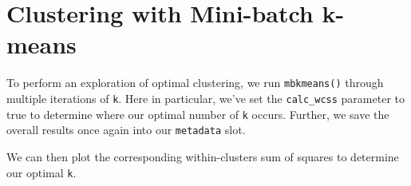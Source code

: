 \documentclass[]{book}
\newenvironment{Shaded}{\begin{snugshade}}{\end{snugshade}}
\newcommand{\ControlFlowTok}[1]{\textcolor[rgb]{0.13,0.29,0.53}{\textbf{#1}}}
\newcommand{\DataTypeTok}[1]{\textcolor[rgb]{0.13,0.29,0.53}{#1}}
\newcommand{\DecValTok}[1]{\textcolor[rgb]{0.00,0.00,0.81}{#1}}
\newcommand{\KeywordTok}[1]{\textcolor[rgb]{0.13,0.29,0.53}{\textbf{#1}}}
\newcommand{\NormalTok}[1]{#1}
\newcommand{\OperatorTok}[1]{\textcolor[rgb]{0.81,0.36,0.00}{\textbf{#1}}}
\newcommand{\OtherTok}[1]{\textcolor[rgb]{0.56,0.35,0.01}{#1}}
\newcommand{\StringTok}[1]{\textcolor[rgb]{0.31,0.60,0.02}{#1}}
\begin{document}
\hypertarget{clustering-with-mini-batch-k-means}{%
\section{Clustering with Mini-batch k-means}\label{clustering-with-mini-batch-k-means}}

To perform an exploration of optimal clustering, we run \texttt{mbkmeans()} through multiple iterations of \texttt{k}. Here in particular, we've set the \texttt{calc\_wcss} parameter to true to determine where our optimal number of \texttt{k} occurs. Further, we save the overall results once again into our \texttt{metadata} slot.

\begin{Shaded}
\end{Shaded}

We can then plot the corresponding within-clusters sum of squares to determine our optimal \texttt{k}.

\begin{Shaded}
\end{Shaded}
\end{document}
